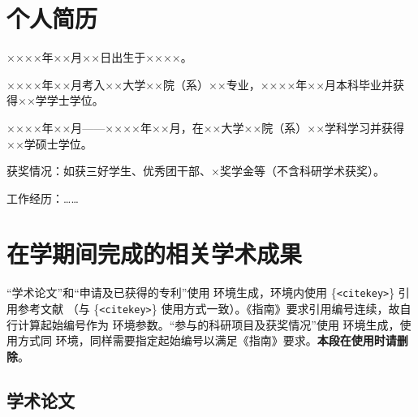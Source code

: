 
\begin{resume}

  \section*{个人简历}

  ××××年××月××日出生于××××。

  ××××年××月考入××大学××院（系）××专业，××××年××月本科毕业并获得××学学士学位。

  ××××年××月——××××年××月，在××大学××院（系）××学科学习并获得××学硕士学位。

  获奖情况：如获三好学生、优秀团干部、×奖学金等（不含科研学术获奖）。

  工作经历：……

  \section*{在学期间完成的相关学术成果}

  “学术论文”和“申请及已获得的专利”使用  环境生成，环境内使用 \{\texttt{<citekey>}\} 引用参考文献
  （与 \{\texttt{<citekey>}\} 使用方式一致）。《指南》要求引用编号连续，故自行计算起始编号作为  环境参数。“参与的科研项目及获奖情况”使用  环境生成，使用方式同  环境，同样需要指定起始编号以满足《指南》要求。\textbf{本段在使用时请删除}。

  \subsection{学术论文}



\end{resume}
